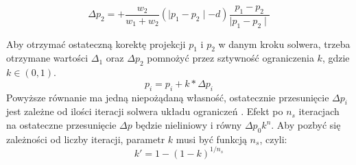 $$\Delta p_2 = + \frac{w_2}{w_1 + w_2} (\mid p_1 - p_2 \mid - d)\frac{p_1 -
	p_2}{\mid p_1 - p_2 \mid}$$

Aby otrzymać ostateczną korektę projekcji $p_1$ i $p_2$ w danym kroku solwera,
	trzeba otrzymane wartości $\Delta _1$ oraz $\Delta p_2$ pomnożyć przez
	sztywność ograniczenia $k$, gdzie $k \in (0, 1)$. 
	$$ p_i = p_i + k * \Delta p_i$$
	Powyższe równanie ma jedną niepożądaną własność, ostatecznie przesunięcie
	$\Delta p_i$ jest zależne od ilości iteracji solwera układu ograniczeń
	. Efekt po $n_s$ iteracjach na ostateczne przesunięcie $\Delta p$
	będzie nieliniowy i równy $\Delta p_0 k^n$. Aby pozbyć się zależności od
	liczby iteracji, parametr $k$ musi być funkcją $n_s$, czyli:
	$$ k' = 1 - (1 - k)^{1/n_s}$$

